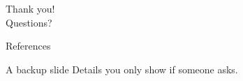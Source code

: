 \documentclass[aspectratio=169,11pt]{beamer}
\begin{document}
\begin{frame}[standout]
  Thank you!\\[.5em]
  {\normalsize Questions?}
\end{frame}

\appendix

\nocite{goodfellow16}
\begin{frame}{References}
  
  
\end{frame}

\begin{frame}{A backup slide}
  Details you only show if someone asks.
\end{frame}
\end{document}
